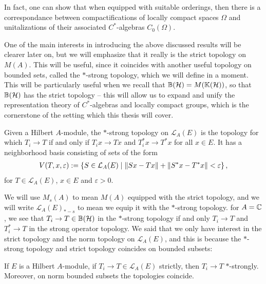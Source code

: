 In fact, one can show that when equipped with suitable orderings, then there is a correspondance between compactifications of locally compact spaces $\Omega$ and unitalizations of their associated $C^*$-algebras $C_0(\Omega)$.


One of the main interests in introducing the above discussed results will be clearer later on, but we will emphasize that it really is the strict topology on $M(A)$. This will be useful, since it coincides with another useful topology on bounded sets, called the $*$-strong topology, which we will define in a moment. This will be particularly useful when we recall that $\mathbb{B}(\mathcal{H})=M(\mathbb{K}(\mathcal{H}))$, so that $\mathbb{B}(\mathcal{H})$ has the strict topology -- this will allow us to expand and unify the representation theory of $C^*$-algebras and locally compact groups, which is the cornerstone of the setting which this thesis will cover.
\begin{definition}
	Given a Hilbert $A$-module, the $*$-strong topology on $\mathcal{L}_A(E)$ is the topology for which $T_i \to T$ if and only if $T_i x \to Tx$ and $T_i^* x \to T^*x$ for all $x \in E$. It has a neighborhood basis consisting of sets of the form
	\begin{align*}
		V(T,x,\varepsilon) := \left\{ S \in \mathcal{L}_A(E) \mid \left\lVert Sx-Tx\right\rVert + \left\lVert S^*x - T^*x\right\rVert < \varepsilon \right\},
	\end{align*}
	for $T \in \mathcal{L}_A(E)$, $x \in E$ and $ \varepsilon > 0$.
\end{definition}
We will use $M_s(A)$ to mean $M(A)$ equipped with the strict topology, and we will write $\mathcal{L}_A(E)_{*-s}$ to mean we equip it with the $*$-strong topology. for $A=\mathbb{C}$, we see that $T_i \to T \in \mathbb{B}(\mathcal{H})$ in the $*$-strong topology if and only $T_i \to T$ and $T_i^* \to T$ in the strong operator topology. We said that we only have interest in the strict topology and the norm topology on $\mathcal{L}_A(E)$, and this is because the $*$-strong topology and strict topology coincides on bounded subsets:
\begin{proposition}
	If $E$ is a Hilbert $A$-module, if $T_i \to T \in \mathcal{L}_A(E)$ strictly, then $T_i \to T$ $*$-strongly. Moreover, on norm bounded subsets the topologies coincide.
\end{proposition}
